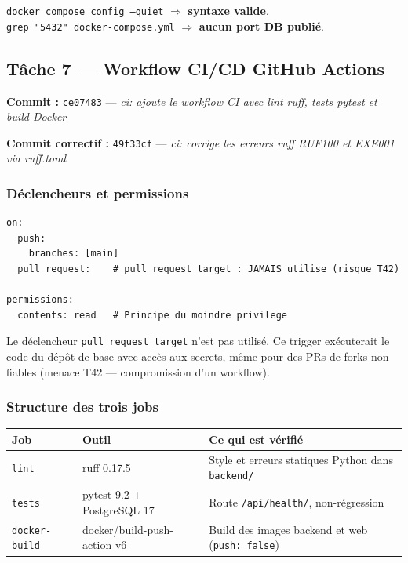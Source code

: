 \documentclass[11pt,a4paper]{article}
\begin{document}
\begin{successbox}[Vérification]
\texttt{docker compose config --quiet} $\Rightarrow$ \textbf{syntaxe valide}.\\
\texttt{grep "5432" docker-compose.yml} $\Rightarrow$ \textbf{aucun port DB publié}.
\end{successbox}

\subsection{Tâche 7 --- Workflow CI/CD GitHub Actions}

\textbf{Commit :} \texttt{ce07483} --- \textit{ci: ajoute le workflow CI avec lint ruff,
tests pytest et build Docker}

\textbf{Commit correctif :} \texttt{49f33cf} --- \textit{ci: corrige les erreurs ruff RUF100
et EXE001 via ruff.toml}

\subsubsection*{Déclencheurs et permissions}

\begin{lstlisting}[caption={Déclencheurs et permissions du workflow CI}]
on:
  push:
    branches: [main]
  pull_request:    # pull_request_target : JAMAIS utilise (risque T42)

permissions:
  contents: read   # Principe du moindre privilege
\end{lstlisting}

Le déclencheur \texttt{pull\_request\_target} n'est pas utilisé. Ce trigger exécuterait le
code du dépôt de base avec accès aux secrets, même pour des PRs de forks non fiables
(menace T42 --- compromission d'un workflow).

\subsubsection*{Structure des trois jobs}

\begin{center}
\renewcommand{\arraystretch}{1.3}
\begin{tabular}{p{3cm}p{3.5cm}p{7cm}}
  \toprule
  \textbf{Job} & \textbf{Outil} & \textbf{Ce qui est vérifié} \\
  \midrule
  \texttt{lint} & ruff 0.17.5 &
    Style et erreurs statiques Python dans \texttt{backend/} \\
  \texttt{tests} & pytest 9.2 + PostgreSQL 17 &
    Route \texttt{/api/health/}, non-régression \\
  \texttt{docker-build} & docker/build-push-action v6 &
    Build des images backend et web (\texttt{push: false}) \\
  \bottomrule
\end{tabular}
\end{center}
\end{document}
